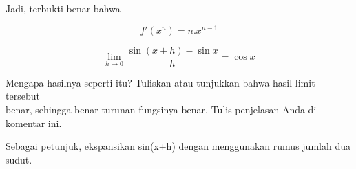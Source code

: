 \documentclass[12pt,arial,letterpaper]{book}
\begin{document}
\begin{eulercomment}
\begin{eulercomment}
\begin{eulercomment}
\begin{eulercomment}
\begin{eulercomment}
\begin{eulercomment}
\begin{eulercomment}
\begin{eulercomment}
\begin{eulercomment}
\begin{eulercomment}
\begin{eulercomment}
\begin{eulercomment}
\begin{eulercomment}
\begin{eulercomment}
\begin{eulercomment}
\begin{eulercomment}
\begin{eulercomment}
\begin{eulercomment}
\begin{eulercomment}
\begin{eulercomment}
\begin{eulercomment}
\begin{eulercomment}
\begin{eulercomment}
Jadi, terbukti benar bahwa\\
\end{eulercomment}
\begin{eulerformula}
\[
f'(x^n) = n.x^{n-1}
\]
\end{eulerformula}
\eulersubheading{}
\begin{eulerformula}
\[
\lim_{h\rightarrow 0}{\frac{\sin \left(x+h\right)-\sin x}{h}}=\cos 
 x
\]
\end{eulerformula}
\begin{eulercomment}
Mengapa hasilnya seperti itu? Tuliskan atau tunjukkan bahwa hasil
limit tersebut\\
benar, sehingga benar turunan fungsinya benar.  Tulis penjelasan Anda
di komentar ini.

Sebagai petunjuk, ekspansikan sin(x+h) dengan menggunakan rumus jumlah
dua sudut.


\end{eulercomment}
\end{eulercomment}
\end{eulercomment}
\end{eulercomment}
\end{eulercomment}
\end{eulercomment}
\end{eulercomment}
\end{eulercomment}
\end{eulercomment}
\end{eulercomment}
\end{eulercomment}
\end{eulercomment}
\end{eulercomment}
\end{eulercomment}
\end{eulercomment}
\end{eulercomment}
\end{eulercomment}
\end{eulercomment}
\end{eulercomment}
\end{eulercomment}
\end{eulercomment}
\end{eulercomment}
\end{eulercomment}
\end{document}
